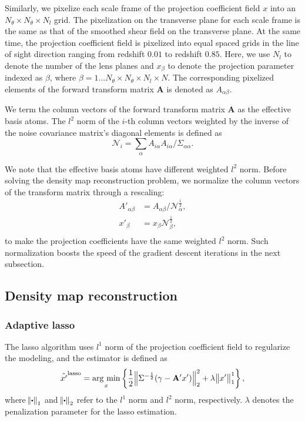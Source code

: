Similarly, we pixelize each scale frame of the projection coefficient field $x$
into an $N_\theta \times N_\theta \times N_l$ grid. The pixelization on the
transverse plane for each scale frame is the same as that of the
smoothed shear field on the transverse plane. At the same time, the projection
coefficient field is pixelized into equal spaced grids in the line of sight
direction ranging from redshift $0.01$ to redshift $0.85$. Here, we use $N_l$
to denote the number of the lens planes and $x_{\beta}$ to denote the
projection parameter indexed as $\beta$, where $\beta=1...N_\theta \times
N_\theta \times N_l \times N$. The corresponding pixelized elements of the
forward transform matrix $\mathbf{A}$ is denoted as $A_{\alpha\beta}$.

We term the column vectors of the forward transform matrix $\mathbf{A}$ as the
effective basis atoms. The $l^2$ norm of the $i$-th column vectors weighted by
the inverse of the noise covariance matrix's diagonal elements is defined as
\begin{equation}
\mathcal{N}_{i}=\sum_\alpha A_{i\alpha}A_{i\alpha}/\Sigma_{\alpha\alpha}.
\end{equation}

We note that the effective basis atoms have different weighted $l^2$ norm.
Before solving the density map reconstruction problem, we normalize the column
vectors of the transform matrix through a rescaling:
\begin{equation}
\begin{split}
A'_{\alpha\beta}&=A_{\alpha\beta}/\mathcal{N}_{\alpha}^{\frac{1}{2}},\\
x'_{\beta}&=x_{\beta}\mathcal{N}_{\beta}^{\frac{1}{2}},\\
\end{split}
\end{equation}
to make the projection coefficients have the same weighted $l^2$ norm.
Such normalization boosts the speed of the gradient descent iterations
in the next subsection.

\subsection{Density map reconstruction}
\label{subsec_method_reconstruction}

\subsubsection{Adaptive lasso}

The lasso algorithm uses $l^1$ norm of the projection coefficient field to
regularize the modeling, and the estimator is defined as
\begin{equation}
\hat{x'}^{\rm{lasso}}=\argmin_{x} \left\{
\frac{1}{2}\norm{\Sigma^{-\frac{1}{2}}(\gamma- \mathbf{A'} x')}_2^2+
\lambda \norm{x'}^1_1\right\},
\end{equation}
where $\norm{\bigcdot}_1$ and $\norm{\bigcdot}_2$ refer to the $l^1$ norm and
$l^2$ norm, respectively.  $\lambda$ denotes the penalization parameter
for the lasso estimation.

